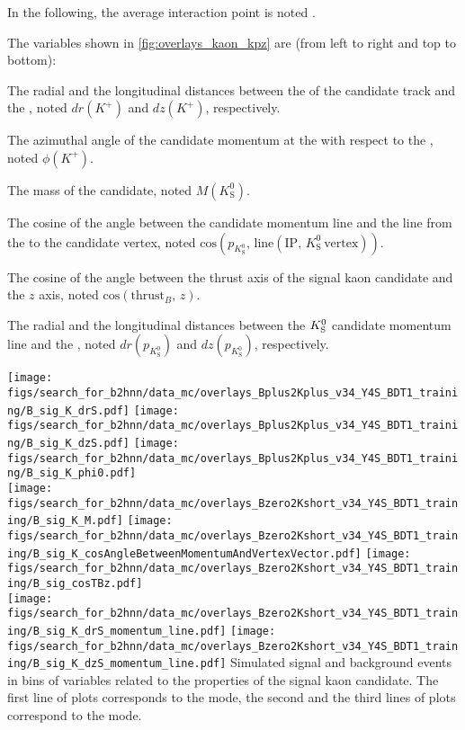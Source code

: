 In the following, the average interaction point is noted \IP.

The variables shown in \cref{fig:overlays_kaon_kpz} are (from left to right and top to bottom):
\bi
\item The radial and the longitudinal distances between the \poca of the \Kp candidate track and the \IP, noted $dr(K^+)$ and $dz(K^+)$, respectively.
\item The azimuthal angle of the \Kp candidate momentum at the \poca with respect to the \IP, noted $\phi(K^+)$.
\item The mass of the \KS candidate, noted $M(K^0_\mathrm{S})$.
\item The cosine of the angle between the \KS candidate momentum line and the line from the \IP to the \KS candidate vertex, noted $\mathrm{cos}(p_{K^0_{\mathrm{S}}},\,\mathrm{line}(\mathrm{IP},\,K^0_\mathrm{S}\,\mathrm{vertex}))$.
\item The cosine of the angle between the thrust axis of the signal kaon candidate and the $z$ axis, noted $\mathrm{cos}(\mathrm{thrust}_B,\,z)$.
\item The radial and the longitudinal distances between the $K^0_{\mathrm{S}}$ candidate momentum line and the \IP, noted $dr(p_{K^0_{\mathrm{S}}})$ and $dz(p_{K^0_{\mathrm{S}}})$, respectively.
\ei

{
\texttt{[image: figs/search\_for\_b2hnn/data\_mc/overlays\_Bplus2Kplus\_v34\_Y4S\_BDT1\_training/B\_sig\_K\_drS.pdf]}
\texttt{[image: figs/search\_for\_b2hnn/data\_mc/overlays\_Bplus2Kplus\_v34\_Y4S\_BDT1\_training/B\_sig\_K\_dzS.pdf]}
\texttt{[image: figs/search\_for\_b2hnn/data\_mc/overlays\_Bplus2Kplus\_v34\_Y4S\_BDT1\_training/B\_sig\_K\_phi0.pdf]}\\
\texttt{[image: figs/search\_for\_b2hnn/data\_mc/overlays\_Bzero2Kshort\_v34\_Y4S\_BDT1\_training/B\_sig\_K\_M.pdf]}
\texttt{[image: figs/search\_for\_b2hnn/data\_mc/overlays\_Bzero2Kshort\_v34\_Y4S\_BDT1\_training/B\_sig\_K\_cosAngleBetweenMomentumAndVertexVector.pdf]}
\texttt{[image: figs/search\_for\_b2hnn/data\_mc/overlays\_Bzero2Kshort\_v34\_Y4S\_BDT1\_training/B\_sig\_cosTBz.pdf]}\\
\texttt{[image: figs/search\_for\_b2hnn/data\_mc/overlays\_Bzero2Kshort\_v34\_Y4S\_BDT1\_training/B\_sig\_K\_drS\_momentum\_line.pdf]}
\texttt{[image: figs/search\_for\_b2hnn/data\_mc/overlays\_Bzero2Kshort\_v34\_Y4S\_BDT1\_training/B\_sig\_K\_dzS\_momentum\_line.pdf]}
}
{
Simulated signal and background events in bins of variables related to the properties of the signal kaon candidate.
The first line of plots corresponds to the \BKpnn mode, the second and the third lines of plots correspond to the \BKznn mode.
\overlaytext
}

